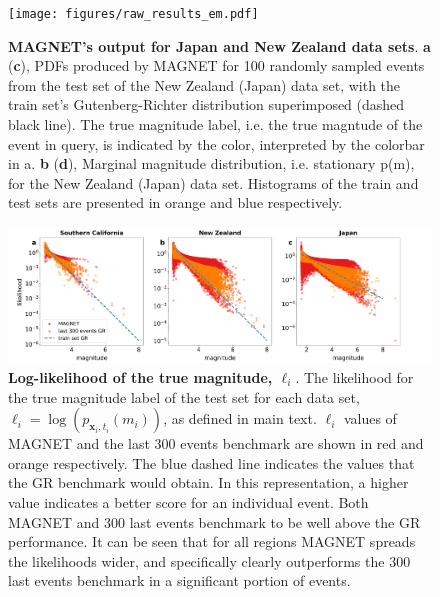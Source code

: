 \documentclass[pdflatex]{sn-jnl}
\begin{document}
\newpage
\begin{figure}[h!]
    \centering
    \texttt{[image: figures/raw\_results\_em.pdf]}
    \caption{
        \textbf{MAGNET’s output for Japan and New Zealand data sets}. \textbf{a} (\textbf{c}), PDFs produced by MAGNET for 100 randomly sampled events from the test set of the New Zealand (Japan) data set, with the train set’s Gutenberg-Richter distribution superimposed (dashed black line). The true magnitude label, i.e. the true magntude of the event in query, is indicated by the color, interpreted by the colorbar in a. \textbf{b} (\textbf{d}), Marginal magnitude distribution, i.e. stationary p(m), for the New Zealand (Japan) data set. Histograms of the train and test sets are presented in orange and blue respectively.
    }
    \label{fig:model_output_em}
\end{figure}

\newpage
\begin{figure}[h!]
    \centering
    \includegraphics[width=1\textwidth]{figures/likelihood_scatter.png}
    \caption{
    \textbf{Log-likelihood of the true magnitude, $\ell_i$}. The likelihood for the true magnitude label of the test set for each data set, $\ell_i=\log\left(p_{\textbf{x}_i, t_i}(m_i)\right)$, as defined in main text. $\ell_i$ values of MAGNET and the last 300 events benchmark are shown in red and orange respectively. The blue dashed line indicates the values that the GR benchmark would obtain. In this representation, a higher value indicates a better score for an individual event. Both MAGNET and 300 last events benchmark to be well above the GR performance. It can be seen that for all regions MAGNET spreads the likelihoods wider, and specifically clearly outperforms the 300 last events benchmark in a significant portion of events. 
    }
    \label{fig:labels_likelihood}
\end{figure}
\end{document}
